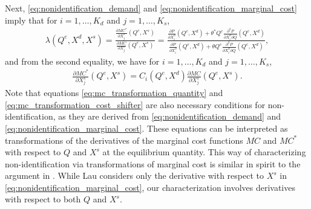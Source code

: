 \documentclass[11pt, a4paper]{article}
\theoremstyle{remark}
\begin{document}



Next, \eqref{eq:nonidentification_demand} and \eqref{eq:nonidentification_marginal_cost} imply that for $i = 1, \ldots, K_d$ and $j = 1, \ldots, K_s$,
\begin{align}
    \lambda(Q^e, X^{d}, X^{s}) =  \frac{\frac{\partial MC^{*}}{\partial X^{s}_j}(Q^e, X^{s})}{\frac{\partial MC}{\partial X^{s}_j}(Q^e, X^{s})} =  \frac{\frac{\partial P}{\partial X^{d}_i}(Q^e, X^{d}) + \theta^{*} Q^e\frac{\partial^2 P}{\partial X^{d}_{i}\partial Q}(Q^e, X^{d}) }{\frac{\partial P}{\partial X^{d}_i}(Q^e, X^{d}) + \theta Q^e\frac{\partial^2 P}{\partial X^{d}_{i}\partial Q}(Q^e, X^{d})},
\end{align}
and from the second equality, we have for $i = 1, \ldots, K_d$ and $j = 1, \ldots, K_s$,
\begin{align}
    \frac{\partial MC^{*}}{\partial X^{s}_j}(Q^e, X^{s}) = C_i(Q^e, X^{d})\frac{\partial MC}{\partial X^{s}_j}(Q^e, X^{s}).\label{eq:mc_transformation_cost_shifter}
\end{align}
Note that equations \eqref{eq:mc_transformation_quantity} and \eqref{eq:mc_transformation_cost_shifter} are also necessary conditions for non-identification, as they are derived from \eqref{eq:nonidentification_demand} and \eqref{eq:nonidentification_marginal_cost}.
These equations can be interpreted as transformations of the derivatives of the marginal cost functions $MC$ and $MC^{*}$ with respect to $Q$ and $X^{s}$ at the equilibrium quantity.
This way of characterizing non-identification via transformations of marginal cost is similar in spirit to the argument in \citet{lau1982identifying}.
While Lau considers only the derivative with respect to $X^{s}$ in \eqref{eq:nonidentification_marginal_cost}, our characterization involves derivatives with respect to both $Q$ and $X^{s}$.
\end{document}
